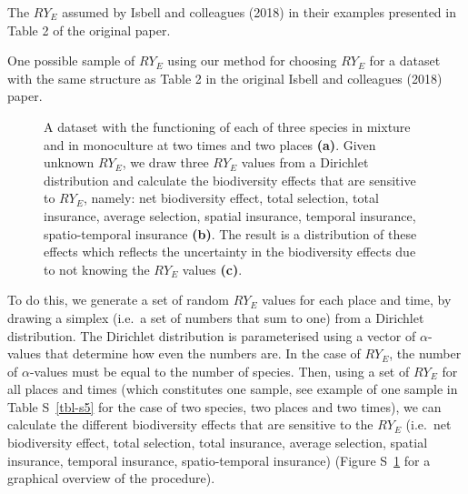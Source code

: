 \documentclass[
  letterpaper,
  DIV=11,
  numbers=noendperiod]{scrartcl}
\begin{document}
\begin{table}

\caption{\label{tbl-s4}The \(RY_E\) assumed by Isbell and colleagues
(2018) in their examples presented in Table 2 of the original paper.}


\end{table}%

\begin{table}

\caption{\label{tbl-s5}One possible sample of \(RY_E\) using our method
for choosing \(RY_E\) for a dataset with the same structure as Table 2
in the original Isbell and colleagues (2018) paper.}


\end{table}%

\begin{figure}


\caption{\label{fig-s6}A dataset with the functioning of each of three
species in mixture and in monoculture at two times and two places
\textbf{(a)}. Given unknown \(RY_E\), we draw three \(RY_E\) values from
a Dirichlet distribution and calculate the biodiversity effects that are
sensitive to \(RY_E\), namely: net biodiversity effect, total selection,
total insurance, average selection, spatial insurance, temporal
insurance, spatio-temporal insurance \textbf{(b)}. The result is a
distribution of these effects which reflects the uncertainty in the
biodiversity effects due to not knowing the \(RY_E\) values
\textbf{(c)}.}

\end{figure}%

To do this, we generate a set of random \(RY_E\) values for each place
and time, by drawing a simplex (i.e.~a set of numbers that sum to one)
from a Dirichlet distribution. The Dirichlet distribution is
parameterised using a vector of \(\alpha\)-values that determine how
even the numbers are. In the case of \(RY_E\), the number of
\(\alpha\)-values must be equal to the number of species. Then, using a
set of \(RY_E\) for all places and times (which constitutes one sample,
see example of one sample in Table S~\ref{tbl-s5} for the case of two
species, two places and two times), we can calculate the different
biodiversity effects that are sensitive to the \(RY_E\) (i.e.~net
biodiversity effect, total selection, total insurance, average
selection, spatial insurance, temporal insurance, spatio-temporal
insurance) (Figure S~\ref{fig-s6} for a graphical overview of the
procedure).
\end{document}
